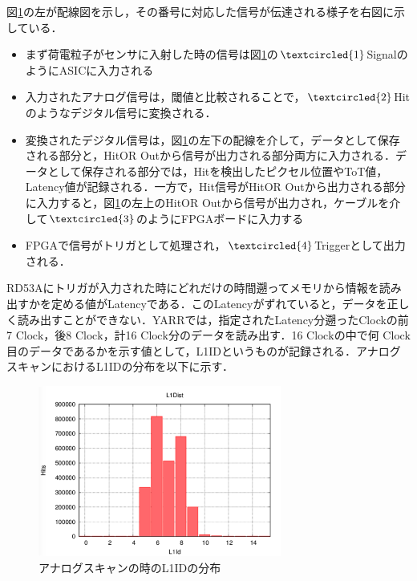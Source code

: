 図\ref{fig:YARRDAQ}の左が配線図を示し，その番号に対応した信号が伝達される様子を右図に示している．\par
\begin{itemize}  
\item まず荷電粒子がセンサに入射した時の信号は図\ref{fig:YARRDAQ}の$\textcircled{\scriptsize1}$SignalのようにASICに入力される\\
\item 入力されたアナログ信号は，閾値と比較されることで，$ \textcircled{\scriptsize2} $Hitのようなデジタル信号に変換される．\\
\item 変換されたデジタル信号は，図\ref{fig:YARRDAQ}の左下の配線を介して，データとして保存される部分と，HitOR Outから信号が出力される部分両方に入力される．データとして保存される部分では，Hitを検出したピクセル位置やToT値，Latency値が記録される．一方で，Hit信号がHitOR Outから出力される部分に入力すると，図\ref{fig:YARRDAQ}の左上のHitOR Outから信号が出力され，ケーブルを介して$ \textcircled{\scriptsize3} $のようにFPGAボードに入力する\\
\item FPGAで信号がトリガとして処理され，$ \textcircled{\scriptsize4} $Triggerとして出力される．
\end{itemize}

RD53Aにトリガが入力された時にどれだけの時間遡ってメモリから情報を読み出すかを定める値がLatencyである．このLatencyがずれていると，データを正しく読み出すことができない．YARRでは，指定されたLatency分遡ったClockの前7 $\mathrm{Clock}$，後8 $\mathrm{Clock}$，計16 $\mathrm{Clock}$分のデータを読み出す．16 $\mathrm{Clock}$の中で何 $\mathrm{Clock}$目のデータであるかを示す値として，L1IDというものが記録される．アナログスキャンにおけるL1IDの分布を以下に示す．\par
\begin{figure}[h]
  \centering
  \includegraphics[width=8cm]{./figure/l1dist.png}
  \caption{アナログスキャンの時のL1IDの分布}
  \label{fig:YARRDAQ}
\end{figure}

